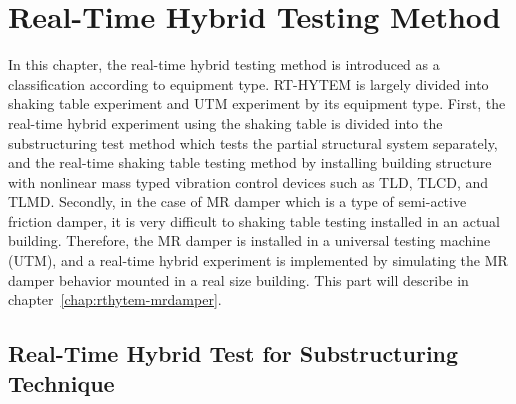 \chapter{Real-Time Hybrid Testing Method}
\label{rthytem}
In this chapter, the real-time hybrid testing method is introduced as a classification according to equipment type. RT-HYTEM is largely divided into shaking table experiment and UTM experiment by its equipment type. First, the real-time hybrid experiment using the shaking table is divided into the substructuring test method which tests the partial structural system separately, and the real-time shaking table testing method by installing building structure with nonlinear mass typed vibration control devices such as TLD, TLCD, and TLMD. Secondly, in the case of MR damper which is a type of semi-active friction damper, it is very difficult to shaking table testing installed in an actual building. Therefore, the MR damper is installed in a universal testing machine (UTM), and a real-time hybrid experiment is implemented by simulating the MR damper behavior mounted in a real size building. This part will describe in chapter~\ref{chap:rthytem-mrdamper}.

\section{Real-Time Hybrid Test for Substructuring Technique}
\label{chap:realtimesubstrct}

